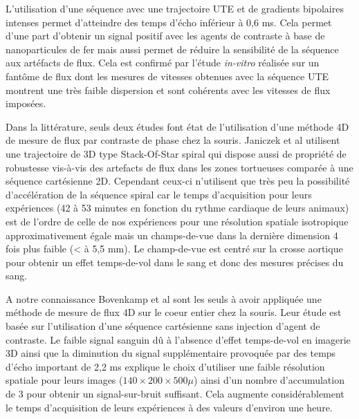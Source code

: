 L'utilisation d'une séquence avec une trajectoire UTE et de gradients bipolaires intenses permet d'atteindre des temps d'écho inférieur à 0,6 ms. Cela permet d'une part d'obtenir un signal positif avec les agents de contraste à base de nanoparticules de fer mais aussi permet de réduire la sensibilité de la séquence aux artéfacts de flux. Cela est confirmé par l'étude \textit{in-vitro} réalisée sur un fantôme de flux dont les mesures de vitesses obtenues avec la séquence UTE montrent une très faible dispersion et sont cohérents avec les vitesses de flux imposées.

Dans la littérature, seuls deux études font état de l'utilisation d'une méthode 4D de mesure de flux par contraste de phase chez la souris. Janiczek et al \cite{Janiczek:2011qm} utilisent une trajectoire de 3D type Stack-Of-Star spiral qui dispose aussi de propriété de robustesse vis-à-vis des artefacts de flux dans les zones tortueuses comparée à une séquence cartésienne 2D. Cependant ceux-ci n'utilisent que très peu la possibilité d'accélération de la séquence spiral car le temps d'acquisition pour leurs expériences (42 à 53 minutes en fonction du rythme cardiaque de leurs animaux) est de l'ordre de celle de nos expériences pour une résolution spatiale isotropique approximativement égale mais un champs-de-vue dans la dernière dimension 4 fois plus faible (< à 5,5 mm). Le champ-de-vue est centré sur la crosse aortique pour obtenir un effet temps-de-vol dans le sang et donc des mesures précises du sang.

A notre connaissance Bovenkamp et al \cite{bovenkamp2014velocity} sont les seuls à avoir appliquée une méthode de mesure de flux 4D sur le coeur entier chez la souris. Leur étude est basée sur l'utilisation d'une séquence cartésienne sans injection d'agent de contraste. Le faible signal sanguin dû à l'absence d'effet temps-de-vol en imagerie 3D ainsi que la diminution du signal supplémentaire provoquée par des temps d'écho important de 2,2 ms explique le choix d'utiliser une faible résolution spatiale pour leurs images ($140 \times 200 \times 500 \mu$) ainsi d'un nombre d'accumulation de 3 pour obtenir un signal-sur-bruit suffisant. Cela augmente considérablement le temps d'acquisition de leurs expériences à des valeurs d'environ une heure.

